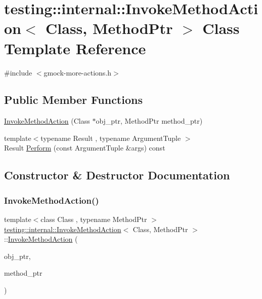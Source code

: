 \hypertarget{classtesting_1_1internal_1_1_invoke_method_action}{}\section{testing\+:\+:internal\+:\+:Invoke\+Method\+Action$<$ Class, Method\+Ptr $>$ Class Template Reference}
\label{classtesting_1_1internal_1_1_invoke_method_action}


{\ttfamily \#include $<$gmock-\/more-\/actions.\+h$>$}

\subsection*{Public Member Functions}
\begin{DoxyCompactItemize}
\item 
\hyperlink{classtesting_1_1internal_1_1_invoke_method_action_a16e545f6166e2d54eeafdc2ab3adf06b}{Invoke\+Method\+Action} (Class $\ast$obj\+\_\+ptr, Method\+Ptr method\+\_\+ptr)
\item 
{\footnotesize template$<$typename Result , typename Argument\+Tuple $>$ }\\Result \hyperlink{classtesting_1_1internal_1_1_invoke_method_action_aed6971c668bc2c7671d512306b25b1ab}{Perform} (const Argument\+Tuple \&args) const
\end{DoxyCompactItemize}


\subsection{Constructor \& Destructor Documentation}
\mbox{\label{classtesting_1_1internal_1_1_invoke_method_action_a16e545f6166e2d54eeafdc2ab3adf06b}} 
\subsubsection{\texorpdfstring{Invoke\+Method\+Action()}{InvokeMethodAction()}}
{\footnotesize\ttfamily template$<$class Class , typename Method\+Ptr $>$ \\
\hyperlink{classtesting_1_1internal_1_1_invoke_method_action}{testing\+::internal\+::\+Invoke\+Method\+Action}$<$ Class, Method\+Ptr $>$\+::\hyperlink{classtesting_1_1internal_1_1_invoke_method_action}{Invoke\+Method\+Action} (\begin{DoxyParamCaption}\item[{Class $\ast$}]{obj\+\_\+ptr,  }\item[{Method\+Ptr}]{method\+\_\+ptr }\end{DoxyParamCaption})\hspace{0.3cm}{\ttfamily [inline]}}



